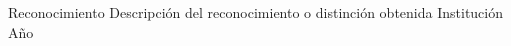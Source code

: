 
\begin{cvhonors}

  \cvhonor
    {Reconocimiento}
    {Descripción del reconocimiento o distinción obtenida}
    {Institución}
    {Año}

\end{cvhonors}
